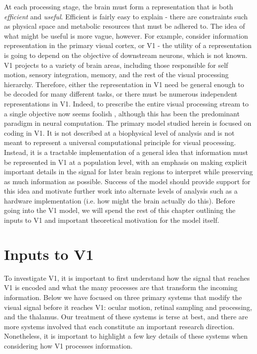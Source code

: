 At each processing stage, the brain must form a representation that is both \textit{efficient} and \textit{useful}. Efficient is fairly easy to explain - there are constraints such as physical space and metabolic resources that must be adhered to. The idea of what might be useful is more vague, however. For example, consider information representation in the primary visual cortex, or V1 - the utility of a representation is going to depend on the objective of downstream neurons, which is not known. V1 projects to a variety of brain areas, including those responsible for self motion, sensory integration, memory, and the rest of the visual processing hierarchy. Therefore, either the representation in V1 need be general enough to be decoded for many different tasks, or there must be numerous independent representations in V1. Indeed, to prescribe the entire visual processing stream to a single objective now seems foolish \parencite{barlow2001redundancy}, although this has been the predominant paradigm in neural computation. The primary model studied herein is focused on coding in V1. It is not described at a biophysical level of analysis and is not meant to represent a universal computational principle for visual processing. Instead, it is a tractable implementation of a general idea that information must be represented in V1 at a population level, with an emphasis on making explicit important details in the signal for later brain regions to interpret while preserving as much information as possible. Success of the model should provide support for this idea and motivate further work into alternate levels of analysis such as a hardware implementation (i.e. how might the brain actually do this). Before going into the V1 model, we will spend the rest of this chapter outlining the inputs to V1 and important theoretical motivation for the model itself.


\section{Inputs to V1}
To investigate V1, it is important to first understand how the signal that reaches V1 is encoded and what the many processes are that transform the incoming information. Below we have focused on three primary systems that modify the visual signal before it reaches V1: ocular motion, retinal sampling and processing, and the thalamus. Our treatment of these systems is terse at best, and there are more systems involved that each constitute an important research direction. Nonetheless, it is important to highlight a few key details of these systems when considering how V1 processes information.


